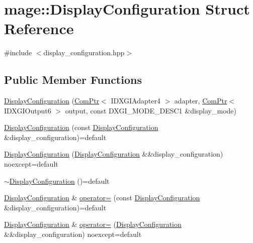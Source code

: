 \hypertarget{structmage_1_1_display_configuration}{}\section{mage\+:\+:Display\+Configuration Struct Reference}
\label{structmage_1_1_display_configuration}


{\ttfamily \#include $<$display\+\_\+configuration.\+hpp$>$}

\subsection*{Public Member Functions}
\begin{DoxyCompactItemize}
\item 
\hyperlink{structmage_1_1_display_configuration_a2ca58b8cc3b408c50fccb9cf94eb5dc6}{Display\+Configuration} (\hyperlink{namespacemage_ae74f374780900893caa5555d1031fd79}{Com\+Ptr}$<$ I\+D\+X\+G\+I\+Adapter4 $>$ adapter, \hyperlink{namespacemage_ae74f374780900893caa5555d1031fd79}{Com\+Ptr}$<$ I\+D\+X\+G\+I\+Output6 $>$ output, const D\+X\+G\+I\+\_\+\+M\+O\+D\+E\+\_\+\+D\+E\+S\+C1 \&display\+\_\+mode)
\item 
\hyperlink{structmage_1_1_display_configuration_a1b99f5eb69a7ec1e525d551a8004f508}{Display\+Configuration} (const \hyperlink{structmage_1_1_display_configuration}{Display\+Configuration} \&display\+\_\+configuration)=default
\item 
\hyperlink{structmage_1_1_display_configuration_a3b84ef28c7dc538a4b55c3b86bbcfb1b}{Display\+Configuration} (\hyperlink{structmage_1_1_display_configuration}{Display\+Configuration} \&\&display\+\_\+configuration) noexcept=default
\item 
\hyperlink{structmage_1_1_display_configuration_a91cdf4f2015177e41290238d96a55328}{$\sim$\+Display\+Configuration} ()=default
\item 
\hyperlink{structmage_1_1_display_configuration}{Display\+Configuration} \& \hyperlink{structmage_1_1_display_configuration_a43d4997e418b27add46442e88ba3672b}{operator=} (const \hyperlink{structmage_1_1_display_configuration}{Display\+Configuration} \&display\+\_\+configuration)=default
\item 
\hyperlink{structmage_1_1_display_configuration}{Display\+Configuration} \& \hyperlink{structmage_1_1_display_configuration_ab3815acd7ca14ea9d6c7631bbf66469a}{operator=} (\hyperlink{structmage_1_1_display_configuration}{Display\+Configuration} \&\&display\+\_\+configuration) noexcept=default

\end{DoxyCompactItemize}
